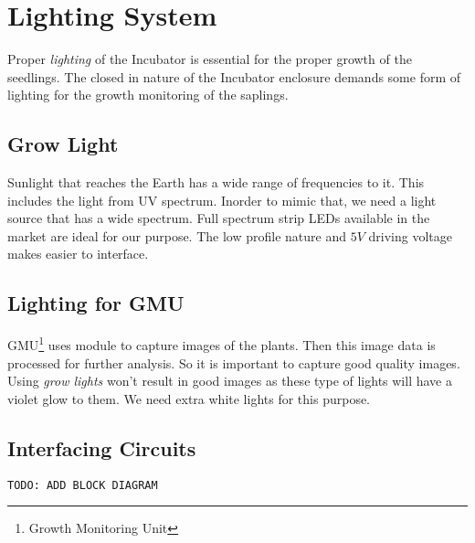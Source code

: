 \documentclass[../../main]{subfiles}
\begin{document}
\section{Lighting System} \label{sec:}

Proper \emph{lighting} of the Incubator is essential for the proper growth of
the seedlings. The closed in nature of the Incubator enclosure demands some
form of lighting for the growth monitoring of the saplings.

\subsection{Grow Light}

Sunlight that reaches the Earth has a wide range of frequencies to it. This includes
the light from UV spectrum. Inorder to mimic that, we need a light source that has
a wide spectrum. Full spectrum strip LEDs available in the market are ideal for our
purpose. The low profile nature and $5\si{V}$ driving voltage makes easier to interface.

\subsection{Lighting for GMU}

GMU\footnote{Growth Monitoring Unit} uses \espcam module to capture images of the plants.
Then this image data is processed for further analysis. So it is important to capture
good quality images. Using \emph{grow lights} won't result in good images as these type
of lights will have a violet glow to them. We need extra white lights for this purpose.

\subsection{Interfacing Circuits}

\texttt{TODO: ADD BLOCK DIAGRAM}
\end{document}
